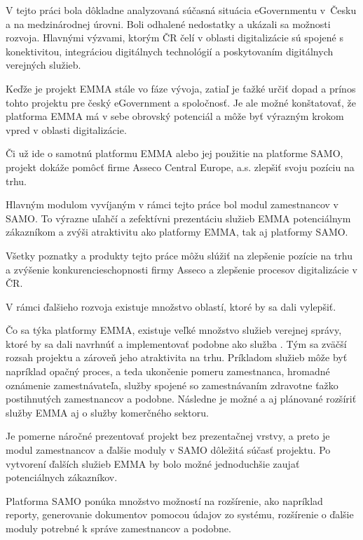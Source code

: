 V tejto práci bola dôkladne analyzovaná súčasná situácia eGovernmentu v~Česku a na medzinárodnej úrovni. Boli odhalené nedostatky a ukázali sa možnosti rozvoja. Hlavnými výzvami, ktorým ČR čelí v oblasti digitalizácie sú spojené s konektivitou, integráciou digitálnych technológií a poskytovaním digitálnych verejných služieb.

Keďže je projekt EMMA stále vo fáze vývoja, zatiaľ je ťažké určiť dopad a prínos tohto projektu pre český eGovernment a spoločnosť. Je ale možné konštatovať, že platforma EMMA má v sebe obrovský potenciál a môže byť výrazným krokom vpred v oblasti digitalizácie. 

Či už ide o samotnú platformu EMMA alebo jej použitie na platforme SAMO, projekt dokáže pomôcť firme Asseco Central Europe, a.s. zlepšiť svoju pozíciu na trhu. 

Hlavným modulom vyvíjaným v rámci tejto práce bol modul zamestnancov v SAMO. To výrazne uľahčí a zefektívni prezentáciu služieb EMMA potenciálnym zákazníkom a zvýši atraktivitu ako platformy EMMA, tak aj platformy SAMO. 

Všetky poznatky a produkty tejto práce môžu slúžiť na zlepšenie pozície na trhu a zvýšenie konkurencieschopnosti firmy Asseco a zlepšenie procesov digitalizácie v ČR.

V rámci ďalšieho rozvoja existuje množstvo oblastí, ktoré by sa dali vylepšiť.

Čo sa týka platformy EMMA, existuje veľké množstvo služieb verejnej sprá\-vy, ktoré by sa dali navrhnúť a implementovať podobne ako služba . Tým sa zväčší rozsah projektu a zároveň jeho atraktivita na trhu. Príkladom služieb môže byť napríklad opačný proces, a teda ukončenie pomeru zamestnanca, hromadné oznámenie zamestnávateľa, služby spojené so zamestnávaním zdravotne ťažko postihnutých zamestnancov a podobne. Následne je možné a aj plánované rozšíriť služby EMMA aj o služby komerčného sektoru.

Je pomerne náročné prezentovať projekt bez prezentačnej vrstvy, a preto je modul zamestnancov a ďalšie moduly v SAMO dôležitá súčasť projektu. Po vytvorení ďalších služieb EMMA by bolo možné jednoduchšie zaujať potenciálnych zákazníkov. 

Platforma SAMO ponúka množstvo možností na rozšírenie, ako napríklad reporty, generovanie dokumentov pomocou údajov zo systému, rozšírenie o ďalšie moduly potrebné k správe zamestnancov a podobne.


